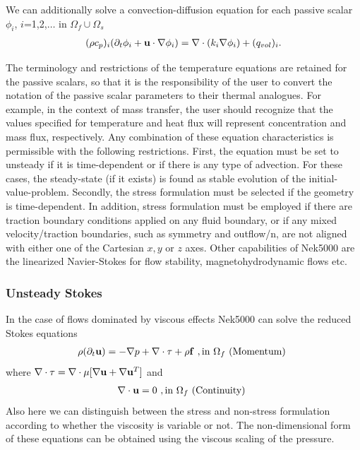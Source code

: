 We can additionally solve a convection-diffusion equation for each passive scalar $\phi_i$,
$i$=1,2,$\ldots$ in $\Omega_f \cup \Omega_s$
\begin{eqnarray}\label{eq:pass_scal}
   (\rho c_{p})_i ( \partial_{t} \phi_{i} + {\bf u} \cdot \nabla \phi_{i} ) =
   \nabla \cdot (k_i \nabla \phi_{i}) + (q_{vol})_i.
\end{eqnarray}

The terminology and
restrictions of the temperature equations are retained for
the passive scalars, so that it is the responsibility of the
user to convert the notation of the passive scalar
parameters to their thermal analogues.
For example, in the context of mass transfer,
the user should recognize that the values specified
for temperature and heat flux
will represent concentration and mass flux, respectively.
Any combination of these equation characteristics is permissible with the
following restrictions. First, the equation must be set to unsteady if it is
time-dependent or if there is any type of advection. For these cases, the
steady-state (if it exists) is found as stable evolution of the
initial-value-problem. Secondly, the stress formulation must be selected if
the geometry is time-dependent. In addition, stress formulation must be
employed if there are traction boundary conditions applied on any fluid
boundary, or if any mixed velocity/traction boundaries, such as symmetry and
outflow/n, are not aligned with either one of the Cartesian $x,y$ or $z$ axes.
Other capabilities of Nek5000 are the linearized Navier-Stokes for flow stability, magnetohydrodynamic flows etc.



\subsubsection*{Unsteady Stokes }
In the case of flows dominated by viscous effects Nek5000 can solve the reduced Stokes equations
\begin{eqnarray}\label{eq:ns_momentum_stokes}
 \rho(\partial_{t} {\bf u} ) = - \nabla p + \nabla \cdot \tau + \rho {\bf f} \,\, , \text{in } \Omega_f \text{  (Momentum)  }
\end{eqnarray}
where $\nabla \cdot\tau=\nabla\cdot\mu[\nabla \mathbf{u}+\nabla \mathbf{u}^{T}]$ and
\begin{eqnarray}\label{eq:ns_cont}
 \nabla \cdot {\bf u} =0 \,\, , \text{in } \Omega_f  \text{  (Continuity)  } 
\end{eqnarray}
Also here we can distinguish between the stress and non-stress formulation according to whether the viscosity is variable or not. The non-dimensional form of these equations can be obtained using the viscous scaling of the pressure.


